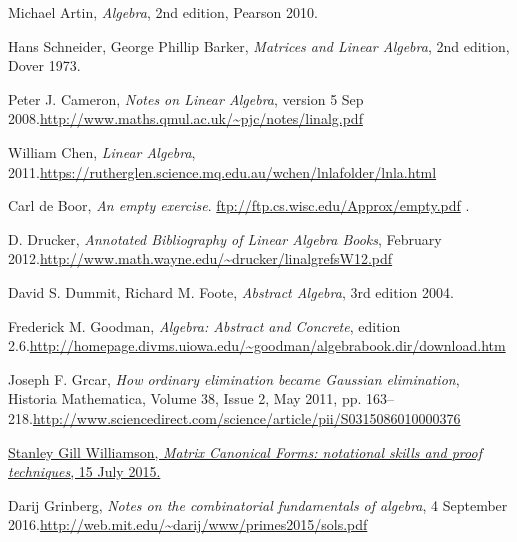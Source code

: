 \documentclass[numbers=enddot,12pt,final,onecolumn,notitlepage]{scrartcl}%
\theoremstyle{definition}
\begin{document}
\begin{thebibliography}{9999999999}                                                                                       %


Michael Artin, \textit{Algebra}, 2nd edition,
Pearson 2010.

Hans Schneider, George Phillip Barker,
\textit{Matrices and Linear Algebra}, 2nd edition, Dover 1973.

Peter J. Cameron, \textit{Notes on Linear
Algebra}, version 5 Sep 2008.\newline\url{http://www.maths.qmul.ac.uk/~pjc/notes/linalg.pdf}

William Chen, \textit{Linear Algebra}, 2011.\newline\url{https://rutherglen.science.mq.edu.au/wchen/lnlafolder/lnla.html}

Carl de Boor, \textit{An empty exercise}.
\url{ftp://ftp.cs.wisc.edu/Approx/empty.pdf} .

D. Drucker, \textit{Annotated Bibliography of
Linear Algebra Books}, February 2012.\newline\url{http://www.math.wayne.edu/~drucker/linalgrefsW12.pdf}

David S. Dummit, Richard M. Foote,
\textit{Abstract Algebra}, 3rd edition 2004.

Frederick M. Goodman, \textit{Algebra: Abstract
and Concrete}, edition 2.6.\newline\url{http://homepage.divms.uiowa.edu/~goodman/algebrabook.dir/download.htm}

Joseph F. Grcar, \textit{How ordinary elimination
became Gaussian elimination}, Historia Mathematica, Volume 38, Issue 2, May
2011, pp. 163--218.\newline\url{http://www.sciencedirect.com/science/article/pii/S0315086010000376}

%
\href{http://cseweb.ucsd.edu/~gill/CILASite/Resources/LinearAlgebra.pdf}{Stanley
Gill Williamson, \textit{Matrix Canonical Forms: notational skills and proof
techniques}, 15 July 2015.}

Darij Grinberg, \textit{Notes on the combinatorial
fundamentals of algebra}, 4 September 2016.\newline\url{http://web.mit.edu/~darij/www/primes2015/sols.pdf}


\end{thebibliography}
\end{document}
